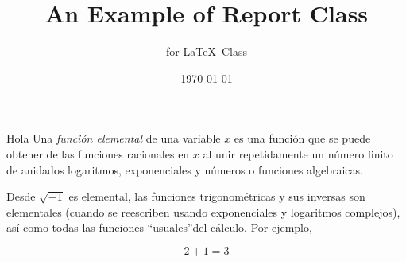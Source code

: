 \documentclass[12pt, a4paper, openright,twoside]{report}
\title{\bf An Example of Report Class}  %
\author{for \LaTeX\ Class}              %
\date{\today}                           %
\begin{document}
Hola
Una \emph{función elemental} de una variable $x$ es una función que se puede obtener de las funciones racionales en $x$ al unir repetidamente un número finito de anidados logaritmos, exponenciales y números o funciones algebraicas.

Desde $\sqrt{-1}$ es elemental, las funciones trigonométricas y sus inversas son elementales (cuando se reescriben usando exponenciales y logaritmos complejos), así como todas las funciones ``usuales''del cálculo. Por ejemplo,

\begin{equation}
2+1=3	
\end{equation}
\end{document}
